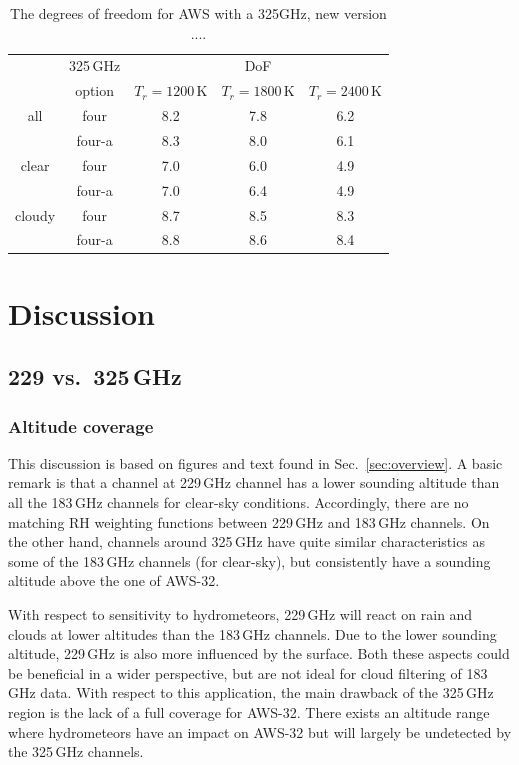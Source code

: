 \documentclass[12pt]{article}
\begin{document}
\begin{table}[!p]
	\centering
	\begin{tabular}[b]{c|c|c|c|c}
&	325\,GHz & \multicolumn{3}{c}{DoF}   \\
&	option &  $T_r = 1200 $\,K &   $T_r = 1800 $\,K &   $T_r = 2400$\,K \\
\hline
			all &	four   &              8.2 &              7.8 &              6.2 \\
				& four-a   &              8.3 &              8.0   &              6.1 \\

\hline
		clear  &	four  &                7.0 &              6.0 &              4.9 \\
			   &   four-a &                7.0 &              6.4 &              4.9 \\
	
\hline	
		cloudy &	four  &              8.7 &              8.5 &              8.3 \\
			   &   four-a &              8.8 &              8.6 &              8.4 \\
\hline
\end{tabular}
\caption{The degrees of freedom for AWS with a 325GHz, new version .... }
\label{tab:DoF:4X}
\end{table}
\section{Discussion}

\subsection{229 vs.\ 325\,GHz}
\subsubsection{Altitude coverage}
%
This discussion is based on figures and text found in Sec.~\ref{sec:overview}.
A basic remark is that a channel at 229\,GHz channel has a lower sounding
altitude than all the 183\,GHz channels for clear-sky conditions. Accordingly,
there are no matching RH weighting functions between 229\,GHz and 183\,GHz
channels. On the other hand, channels around 325\,GHz have quite similar
characteristics as some of the 183\,GHz channels (for clear-sky), but
consistently have a sounding altitude above the one of AWS-32.

With respect to sensitivity to hydrometeors, 229\,GHz will react on rain and
clouds at lower altitudes than the 183\,GHz channels. Due to the lower sounding
altitude, 229\,GHz is also more influenced by the surface. Both these aspects
could be beneficial in a wider perspective, but are not ideal for cloud
filtering of 183\,GHz data. With respect to this application, the main drawback
of the 325\,GHz region is the lack of a full coverage for AWS-32. There exists
an altitude range where hydrometeors have an impact on AWS-32 but will largely
be undetected by the 325\,GHz channels.
\end{document}

